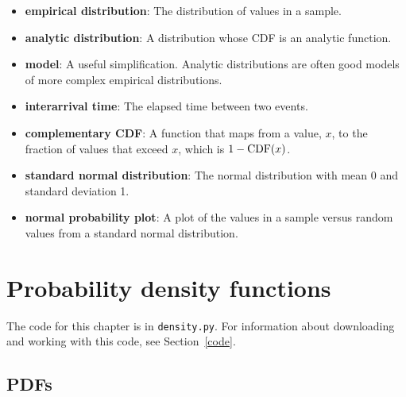\documentclass[12pt]{book}
\begin{document}
\begin{itemize}

\item {\bf empirical distribution}: The distribution of values in a sample.
   

\item {\bf analytic distribution}: A distribution whose CDF is an analytic
function.

\item {\bf model}: A useful simplification.  Analytic distributions are
often good models of more complex empirical distributions.

\item {\bf interarrival time}: The elapsed time between two events.

\item {\bf complementary CDF}: A function that maps from a value, $x$,
to the fraction of values that exceed $x$, which is $1 - \mathrm{CDF}(x)$.
  

\item {\bf standard normal distribution}: The normal distribution with
mean 0 and standard deviation 1.

\item {\bf normal probability plot}: A plot of the values in a sample versus
random values from a standard normal distribution.

\end{itemize}


\chapter{Probability density functions}
\label{density}

The code for this chapter is in \verb"density.py".  For information
about downloading and working with this code, see Section~\ref{code}.


\section{PDFs}
\end{document}
